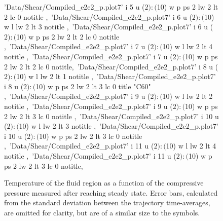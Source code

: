 \documentclass[aps,prb,reprint,superscriptaddress, a4paper]{revtex4-1}
\begin{document}
\begin{figure}
\begin{center}
\begin{gnuplot}[terminal=pdf, terminaloptions={size \SERFigwidth cm, \SERFigheight cm color solid}]
							'Data/Shear/Compiled_e2e2_p.plot7' i 5 u ($2):($10) w p ps 2   lw 2  lt 2  lc 0  notitle ,\
						'Data/Shear/Compiled_e2e2_p.plot7' i 6 u ($2):($10) w l  lw 2  lt 3 notitle   ,\
						'Data/Shear/Compiled_e2e2_p.plot7' i 6 u ($2):($10) w p ps 2   lw 2  lt 2  lc 0  notitle   ,\
							'Data/Shear/Compiled_e2e2_p.plot7' i 7 u ($2):($10) w l  lw 2  lt 4 notitle ,\
							'Data/Shear/Compiled_e2e2_p.plot7' i 7 u ($2):($10) w p ps 2   lw 2  lt 2  lc 0  notitle,\
						'Data/Shear/Compiled_e2e2_p.plot7' i 8 u ($2):($10) w l  lw 2  lt 1 notitle ,\
						'Data/Shear/Compiled_e2e2_p.plot7' i 8 u ($2):($10) w p ps 2   lw 2  lt 3 lc 0  title "C60" ,\
							'Data/Shear/Compiled_e2e2_p.plot7' i 9 u ($2):($10) w l  lw 2  lt 2 notitle ,\
							'Data/Shear/Compiled_e2e2_p.plot7' i 9 u ($2):($10) w p ps 2   lw 2  lt 3  lc 0  notitle ,\
						'Data/Shear/Compiled_e2e2_p.plot7' i 10 u ($2):($10) w l  lw 2  lt 3 notitle   ,\
						'Data/Shear/Compiled_e2e2_p.plot7' i 10 u ($2):($10) w p ps 2   lw 2  lt 3  lc 0  notitle   ,\
							'Data/Shear/Compiled_e2e2_p.plot7' i 11 u ($2):($10) w l  lw 2  lt 4 notitle ,\
							'Data/Shear/Compiled_e2e2_p.plot7' i 11 u ($2):($10) w p ps 2   lw 2  lt 3  lc 0  notitle,\
		\end{gnuplot}

		\caption{Temperature of the fluid region  as a function of the compressive pressure measured after reaching steady state. Error bars, calculated from the standard deviation between the trajectory time-averages, are omitted for clarity, but are of a similar size to the symbols.}
		\label{fig:T_P}
	\end{center}
 \end{figure}
\end{document}
